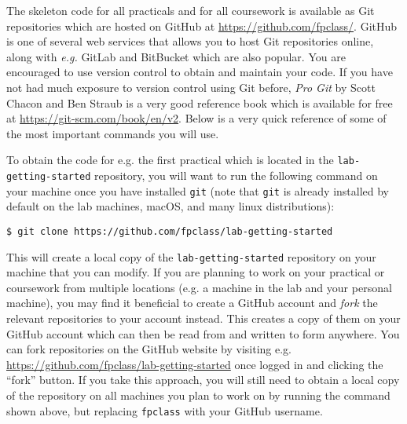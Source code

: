 The skeleton code for all practicals and for all coursework is available as Git repositories which are hosted on GitHub at {\small \url{https://github.com/fpclass/}}. GitHub is one of several web services that allows you to host Git repositories online, along with \emph{e.g.} GitLab and BitBucket which are also popular. You are encouraged to use version control to obtain and maintain your code. If you have not had much exposure to version control using Git before, \emph{Pro Git} by Scott Chacon and Ben Straub is a very good reference book which is available for free at {\small \url{https://git-scm.com/book/en/v2}}. Below is a very quick reference of some of the most important commands you will use.

To obtain the code for e.g. the first practical which is located in the \texttt{\small lab-getting-started} repository, you will want to run the following command on your machine once you have installed \texttt{\small git} (note that \texttt{\small git} is already installed by default on the lab machines, macOS, and many linux distributions):
\begin{verbatim}
$ git clone https://github.com/fpclass/lab-getting-started
\end{verbatim}
This will create a local copy of the \texttt{\small lab-getting-started} repository on your machine that you can modify. If you are planning to work on your practical or coursework from multiple locations (e.g. a machine in the lab and your personal machine), you may find it beneficial to create a GitHub account and \emph{fork} the relevant repositories to your account instead. This creates a copy of them on your GitHub account which can then be read from and written to form anywhere. You can fork repositories on the GitHub website by visiting e.g. {\small \url{https://github.com/fpclass/lab-getting-started}} once logged in and clicking the ``fork'' button. If you take this approach, you will still need to obtain a local copy of the repository on all machines you plan to work on by running the command shown above, but replacing \texttt{\small fpclass} with your GitHub username. 


